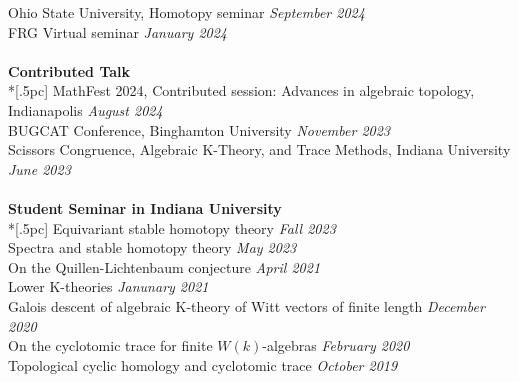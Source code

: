 \documentclass{article}
\begin{document}
{ Ohio State University, Homotopy seminar} \hfill {\it September 2024\/}  \\
{ FRG Virtual seminar} \hfill {\it January 2024\/}  \\
\\
{\bf \large Contributed Talk} \\*[.5pc]
{MathFest 2024, Contributed session: Advances in algebraic topology, Indianapolis} \hfill {\it August 2024\/}  \\
{BUGCAT Conference, Binghamton University} \hfill {\it November 2023\/}  \\
{Scissors Congruence, Algebraic K-Theory, and Trace Methods, Indiana University} \hfill {\it June 2023\/}  \\
\\
{\bf \large Student Seminar in Indiana University} \\*[.5pc]
{Equivariant stable homotopy theory} \hfill {\it Fall 2023\/} \\
{Spectra and stable homotopy theory} \hfill {\it May 2023\/} \\
{On the Quillen-Lichtenbaum conjecture} \hfill {\it April 2021\/} \\
{Lower K-theories} \hfill {\it Janunary 2021\/} \\
{Galois descent of algebraic K-theory of Witt vectors of finite length} \hfill {\it December 2020\/} \\
{On the cyclotomic trace for finite $W(k)$-algebras} \hfill {\it February 2020\/} \\
{Topological cyclic homology and cyclotomic trace} \hfill {\it October 2019\/} \\
\end{document}

